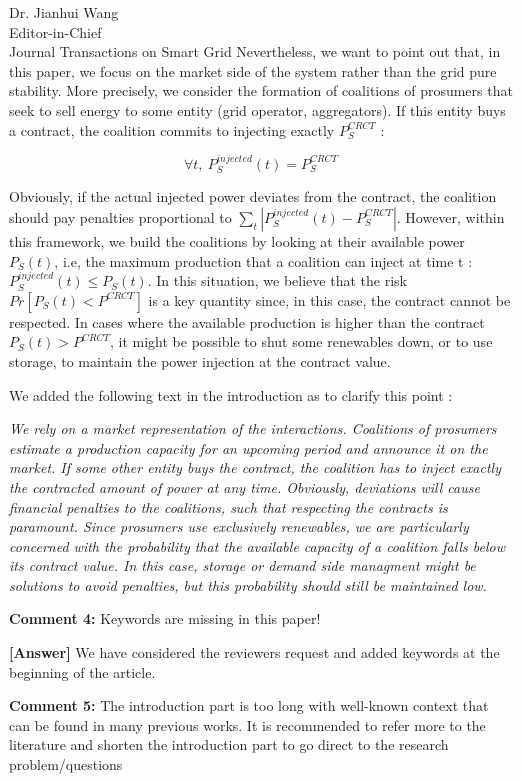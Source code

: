 \documentclass{letter}
\begin{document}
\begin{letter}{Dr. Jianhui Wang \\ Editor-in-Chief \\ Journal Transactions on Smart Grid }
Nevertheless, we want to point out that, in this paper, we focus on the market side of the system rather than the grid pure stability. More precisely, we consider the formation of coalitions of prosumers that seek to sell energy to some entity (grid operator, aggregators). If this entity buys a contract, the coalition commits to injecting exactly $ P_S^{CRCT} $ : 

\begin{equation}
\forall t,\ P_S^{injected}(t) = P_S^{CRCT} 
\end{equation}

Obviously, if the actual injected power deviates from the contract, the coalition should pay penalties proportional to $ \sum_t \left| P_S^{injected}(t) - P_S^{CRCT} \right| $. However, within this framework, we build the coalitions by looking at their available power $P_S(t)$, i.e, the maximum production that a coalition can inject at time t : $ P_S^{injected}(t) \leq P_S(t) $. 
In this situation, we believe that the risk $ Pr[P_S(t) < P^{CRCT} ] $ is a key quantity since, in this case, the contract cannot be respected. In cases where the available production is higher than the contract $ P_S(t) > P^{CRCT} $, it might be possible to shut some renewables down, or to use storage, to maintain the power injection at the contract value.

We added the following text in the introduction as to clarify this point :

\textit{We rely on a market representation of the interactions. Coalitions of prosumers estimate a production capacity for an upcoming period and announce it on the market. If some other entity buys the contract, the coalition has to inject exactly the contracted amount of power at any time. Obviously, deviations will cause financial penalties to the coalitions, such that respecting the contracts is paramount. Since prosumers use exclusively renewables, we are particularly concerned with the probability that the available capacity of a coalition falls below its contract value. In this case, storage or demand side managment might be solutions to avoid penalties, but this probability should still be maintained low.}

\textbf{Comment 4:} Keywords are missing in this paper!


\textbf{[Answer]} We have considered the reviewers request and added keywords at the beginning of the article.


\textbf{Comment 5:} The introduction part is too long with well-known context that can be found in many previous works. It is recommended to refer more to the literature and shorten the introduction part to go direct to the research problem/questions



\end{letter}
\end{document}
